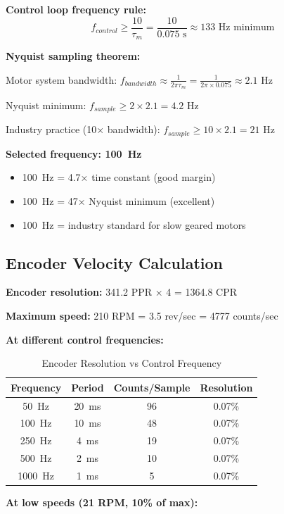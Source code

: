 \documentclass[12pt,letterpaper]{article}
\begin{document}
\textbf{Control loop frequency rule:}
\begin{equation}
f_{control} \geq \frac{10}{\tau_m} = \frac{10}{0.075 \text{ s}} \approx 133 \text{ Hz minimum}
\end{equation}

\textbf{Nyquist sampling theorem:}

Motor system bandwidth: $f_{bandwidth} \approx \frac{1}{2\pi\tau_m} = \frac{1}{2\pi \times 0.075} \approx 2.1$ Hz

Nyquist minimum: $f_{sample} \geq 2 \times 2.1 = 4.2$ Hz

Industry practice (10× bandwidth): $f_{sample} \geq 10 \times 2.1 = 21$ Hz

\textbf{Selected frequency: 100~Hz}
\begin{itemize}
    \item 100~Hz = 4.7× time constant (good margin)
    \item 100~Hz = 47× Nyquist minimum (excellent)
    \item 100~Hz = industry standard for slow geared motors
\end{itemize}

\subsection{Encoder Velocity Calculation}

\textbf{Encoder resolution:} 341.2 PPR × 4 = 1364.8 CPR

\textbf{Maximum speed:} 210 RPM = 3.5 rev/sec = 4777 counts/sec

\textbf{At different control frequencies:}

\begin{table}[H]
\centering
\caption{Encoder Resolution vs Control Frequency}
\begin{tabular}{cccc}
\toprule
\textbf{Frequency} & \textbf{Period} & \textbf{Counts/Sample} & \textbf{Resolution} \\
\midrule
50~Hz & 20~ms & 96 & 0.07\% \\
100~Hz & 10~ms & 48 & 0.07\% \\
250~Hz & 4~ms & 19 & 0.07\% \\
500~Hz & 2~ms & 10 & 0.07\% \\
1000~Hz & 1~ms & 5 & 0.07\% \\
\bottomrule
\end{tabular}
\end{table}

\textbf{At low speeds (21 RPM, 10\% of max):}
\end{document}
